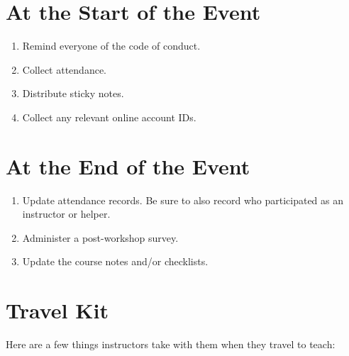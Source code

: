 \section*{At the Start of the Event}

\begin{enumerate}
\item
  Remind everyone of the code of conduct.
\item
  Collect attendance.
\item
  Distribute sticky notes.
\item
  Collect any relevant online account IDs.
\end{enumerate}

\section*{At the End of the Event}

\begin{enumerate}
\item
  Update attendance records. Be sure to also record who participated as
  an instructor or helper.
\item
  Administer a post-workshop survey.
\item
  Update the course notes and/or checklists.
\end{enumerate}

\section*{Travel Kit}

Here are a few things instructors take with them when they travel to
teach:

